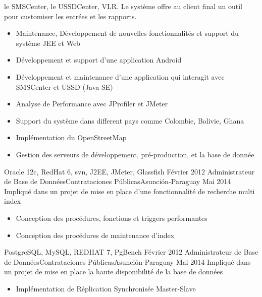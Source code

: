 \begin{experiences}
{                 le SMSCenter, le USSDCenter, VLR. Le système offre au client final un outil pour customiser les
                 entrées et les rapports.
                  }
                 {
                      \begin{itemize}
                        \item Maintenance, Développement de nouvelles fonctionnalités et support du système JEE et Web
                        \item Développement et support d'une application Android
                        \item Développement et maintenance d’une application qui interagit avec SMSCenter et USSD (Java SE)
                        \item Analyse de Performance avec JProfiler et JMeter
                        \item Support du système dans different pays comme Colombie, Bolivie, Ghana
                        \item Implémentation du OpenStreetMap
                        \item Gestion des serveurs de développement, pré-production, et la base de donnée
                      \end{itemize}
				         }
                 {Oracle 12c, RedHat 6, svn, J2EE, JMeter, Glassfish}
  \emptySeparator
  \projectexperiences
    {Février 2012}   {Administrateur de Base de Données}{Contrataciones Públicas}{Asunción-Paraguay}
    {Mai 2014}      {
                      Impliqué dans un projet de mise en place d'une fonctionnalité de recherche multi index
                    }
                    {
                      \begin{itemize}
                        \item Conception des procédures, fonctions et triggers performantes
                        \item Conception des procédures de maintenance d'index
                      \end{itemize}
                    }
                {PostgreSQL, MySQL, REDHAT 7, PgBench}
  \emptySeparator
  \projectexperiences
    {Février 2012}   {Administrateur de Base de Données}{Contrataciones Públicas}{Asunción-Paraguay}
    {Mai 2014}      {
                      Impliqué dans un projet de mise en place la haute disponibilité de la base de données
                    }
                    {
                      \begin{itemize}
                        \item Implémentation de Réplication Synchronisée Master-Slave

\end{itemize}}
\end{experiences}
